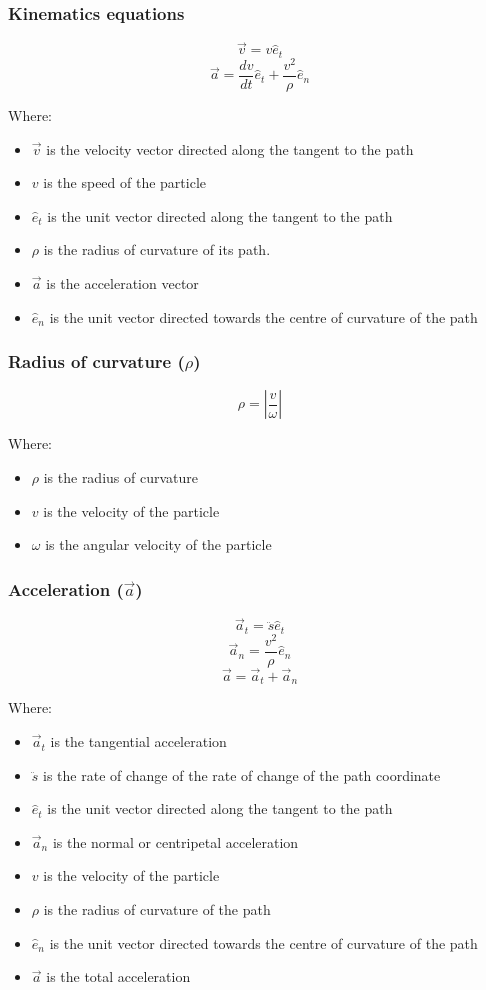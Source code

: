 \documentclass[11pt]{article}
\begin{document}
\subsubsection{Kinematics equations}
\label{sec:org46ca586}
\[\vec{v} = v \hat{e}_t\]
\[\vec{a} = \frac{dv}{dt} \hat{e}_t + \frac{v^2}{\rho} \hat{e}_n\]

Where:
\begin{itemize}
\item \(\vec{v}\) is the velocity vector directed along the tangent to the path
\item \(v\) is the speed of the particle
\item \(\hat{e}_t\) is the unit vector directed along the tangent to the path
\item \(\rho\) is the radius of curvature of its path.
\item \(\vec{a}\) is the acceleration vector
\item \(\hat{e}_n\) is the unit vector directed towards the centre of curvature of the path
\end{itemize}

\subsubsection{Radius of curvature (\(\rho\))}
\label{sec:org6c2e35f}
\[\rho = \left| \frac{v}{\omega} \right|\]

Where:
\begin{itemize}
\item \(\rho\) is the radius of curvature
\item \(v\) is the velocity of the particle
\item \(\omega\) is the angular velocity of the particle
\end{itemize}

\subsubsection{Acceleration (\(\vec{a}\))}
\label{sec:org3a4fbd2}
\[\vec{a}_t = \ddot{s} \hat{e}_t\]
\[\vec{a}_n = \frac{v^2}{\rho} \hat{e}_n\]
\[\vec{a} = \vec{a}_t + \vec{a}_n\]

Where:
\begin{itemize}
\item \(\vec{a}_t\) is the tangential acceleration
\item \(\ddot{s}\) is the rate of change of the rate of change of the path coordinate
\item \(\hat{e}_t\) is the unit vector directed along the tangent to the path
\item \(\vec{a}_n\) is the normal or centripetal acceleration
\item \(v\) is the velocity of the particle
\item \(\rho\) is the radius of curvature of the path
\item \(\hat{e}_n\) is the unit vector directed towards the centre of curvature of the path
\item \(\vec{a}\) is the total acceleration
\end{itemize}
\end{document}
